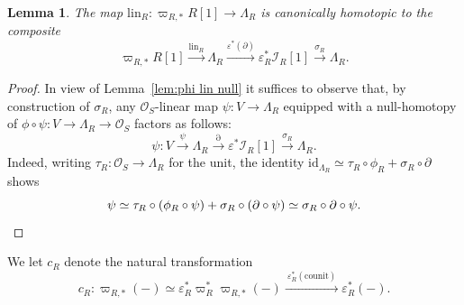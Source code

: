 \documentclass[12pt, oneside]{amsart}
\numberwithin{equation}{section}
\newtheorem{lemma}[subsubsection]{Lemma}
\theoremstyle{remark}
\theoremstyle{plain}
\newcommand{\lam}{\Lambda}
\newcommand{\OO}{\mathcal{O}}
\newcommand{\id}{\mathrm{id}}
\newcommand{\eps}{\varepsilon}
\begin{document}
\begin{lemma}\label{lem:mozambique}
  The map $\mathrm{lin}_{R} : \varpi_{R,*} R[1] \to \lam_R$ is canonically homotopic to the composite
  \[
    \varpi_{R,*} R[1]
    \xrightarrow{\mathrm{lin}_{R}} \lam_R
    \xrightarrow{\eps^*(\partial)} \eps_R^* \mathcal{I}_R[1]
    \xrightarrow{\sigma_R} \lam_R.
  \]
\end{lemma}
\begin{proof}
In view of Lemma~\ref{lem:phi lin null} it suffices to observe that, by construction of $\sigma_R$, any $\OO_S$-linear map $\psi : V \to \lam_R$ equipped with a null-homotopy of $\phi \circ \psi : V \to \lam_R \to \OO_S$ factors as follows:
\[
  \psi : V
  \xrightarrow{\psi} \lam_R
  \xrightarrow{\partial} \eps^* \mathcal{I}_R [1]
  \xrightarrow{\sigma_R} \lam_R.
\]
Indeed, writing $\tau_R : \OO_S \to \lam_R$ for the unit, the identity $\id_{\lam_R} \simeq \tau_R \circ \phi_R + \sigma_R \circ \partial$ shows
\[
  \psi \simeq \tau_R \circ (\phi_R \circ \psi) + \sigma_R \circ (\partial \circ \psi) \simeq \sigma_R \circ \partial \circ \psi.
  \qedhere
\]
\end{proof}

We let $c_R$ denote the natural transformation
\[
  c_R : \varpi_{R,*}(-)
  \simeq \eps_R^* \varpi_R^* \varpi_{R,*}(-) \xrightarrow{\ \eps_R^*(\mathrm{counit})\ } \eps_R^*(-).
\]
\end{document}
